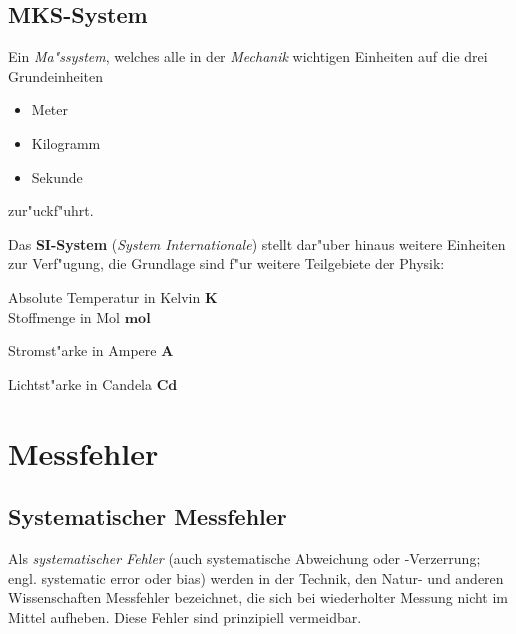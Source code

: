 \subsection{MKS-System}
\label{kap_mks-system}

\begin{Def}
   Ein \emph{Ma"ssystem}, welches alle in der \emph{Mechanik} wichtigen
   Einheiten auf die drei Grundeinheiten
   \begin{itemize}
   \item Meter
   \item Kilogramm
   \item Sekunde
   \end{itemize}
   zur"uckf"uhrt.
\end{Def}

 Das \textbf{SI-System} (\emph{System
  Internationale}) stellt dar"uber hinaus weitere Einheiten zur
Verf"ugung, die Grundlage sind f"ur weitere Teilgebiete der Physik:

\begin{description}[\setlabelstyle{\bfseries\slshape}]
\item[Thermodynamik] Absolute Temperatur in Kelvin $\mathbf
   K$\\Stoffmenge in Mol $\mathbf{mol}$
     \item[Elektrodynamik] Stromst"arke in Ampere $\mathbf A$
     \item[Optik] Lichtst"arke in Candela $\mathbf{Cd}$
 \end{description}






\section{Messfehler}

\subsection{Systematischer Messfehler}

\begin{Def}
     Als \emph{systematischer Fehler} (auch systematische Abweichung oder -Verzerrung; engl. systematic error oder bias) werden in der Technik, den Natur- und anderen Wissenschaften Messfehler bezeichnet, die sich bei wiederholter Messung nicht im Mittel aufheben. Diese Fehler sind prinzipiell vermeidbar.
\end{Def}

